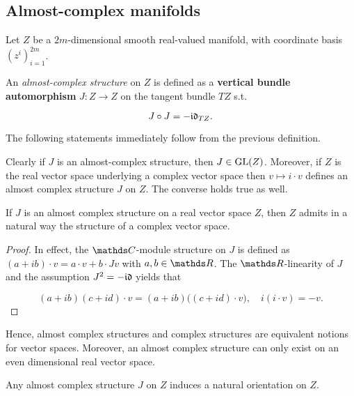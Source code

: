 \clearpage

\subsection{Almost-complex manifolds}

Let $Z$ be a $2m$-dimensional smooth real-valued manifold, with coordinate basis $(z^i)_{i=1}^{2m}$. 

\begin{df}
    An \textit{almost-complex structure } on $Z$ is defined as a \textbf{vertical bundle automorphism} $J: Z \rightarrow Z$ on the tangent bundle $TZ$ s.t. 

    $$
         J \circ J = - \mathfrak{i}\mathfrak{d}_{TZ}.
    $$
\end{df}

The following statements immediately follow from the previous definition. \medbreak 

Clearly if $J$ is an almost-complex structure, then $J \in \textnormal{GL}(Z)$. Moreover, if $Z$ is the real vector space underlying a complex vector space then $v \mapsto i\cdot v$ defines an almost complex structure $J$ on $Z$. The converse holds true as well.

\begin{lemma}
    If $J$ is an almost complex structure on a real vector space $Z$, then $Z$ admits in a natural way the structure of a complex vector space. 
\end{lemma}

\begin{proof}
    In effect, the $\C$-module structure on $J$ is defined as $(a+ib)\cdot v = a \cdot v + b \cdot J v$ with $a,b \in \R$. The $\R$-linearity of $J$ and the assumption $J^2 = -\mathfrak{i}\mathfrak{d}$ yields that 
    
    \begin{equation*}
        (a+ib)(c+id)\cdot v = (a+ib) \bigg((c+id) \cdot v\bigg), \quad i(i\cdot v) = -v.  
    \end{equation*}
\end{proof}

Hence, almost complex structures and complex structures are equivalent notions for vector spaces. Moreover, an almost complex structure can only exist on an even dimensional real vector space. 

\begin{lemma}
    Any almost complex structure $J$ on $Z$ induces a natural orientation on $Z$. 
\end{lemma}
      
